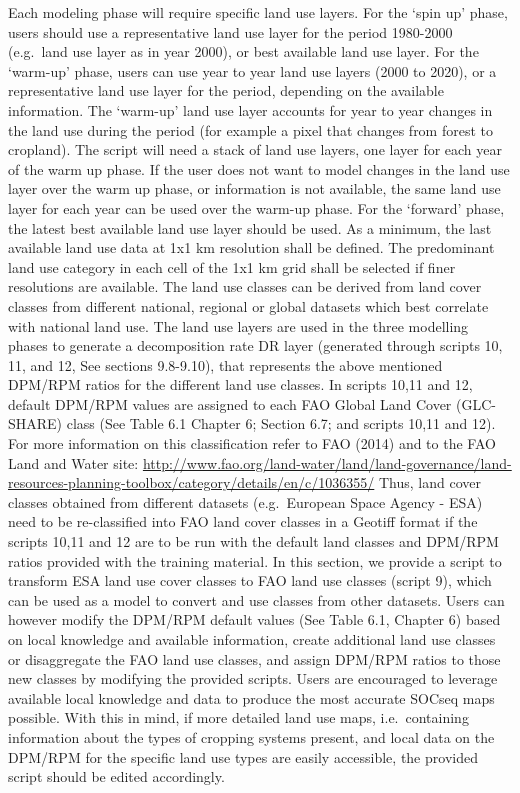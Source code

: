 \documentclass[
  10pt,
  b5paper,
]{book}
\begin{document}
Each modeling phase will require specific land use layers. For the `spin up' phase, users should use a representative land use layer for the period 1980-2000 (e.g.~land use layer as in year 2000), or best available land use layer. For the `warm-up' phase, users can use year to year land use layers (2000 to 2020), or a representative land use layer for the period, depending on the available information. The `warm-up' land use layer accounts for year to year changes in the land use during the period (for example a pixel that changes from forest to cropland). The script will need a stack of land use layers, one layer for each year of the warm up phase. If the user does not want to model changes in the land use layer over the warm up phase, or information is not available, the same land use layer for each year can be used over the warm-up phase. For the `forward' phase, the latest best available land use layer should be used.
As a minimum, the last available land use data at 1x1 km resolution shall be defined. The predominant land use category in each cell of the 1x1 km grid shall be selected if finer resolutions are available.
The land use classes can be derived from land cover classes from different national, regional or global datasets which best correlate with national land use. The land use layers are used in the three modelling phases to generate a decomposition rate DR layer (generated through scripts 10, 11, and 12, See sections 9.8-9.10), that represents the above mentioned DPM/RPM ratios for the different land use classes. In scripts 10,11 and 12, default DPM/RPM values are assigned to each FAO Global Land Cover (GLC-SHARE) class (See Table 6.1 Chapter 6; Section 6.7; and scripts 10,11 and 12). For more information on this classification refer to FAO (2014) and to the FAO Land and Water site: \url{http://www.fao.org/land-water/land/land-governance/land-resources-planning-toolbox/category/details/en/c/1036355/}
Thus, land cover classes obtained from different datasets (e.g.~European Space Agency - ESA) need to be re-classified into FAO land cover classes in a Geotiff format if the scripts 10,11 and 12 are to be run with the default land classes and DPM/RPM ratios provided with the training material.
In this section, we provide a script to transform ESA land use cover classes to FAO land use classes (script 9), which can be used as a model to convert and use classes from other datasets. Users can however modify the DPM/RPM default values (See Table 6.1, Chapter 6) based on local knowledge and available information, create additional land use classes or disaggregate the FAO land use classes, and assign DPM/RPM ratios to those new classes by modifying the provided scripts. Users are encouraged to leverage available local knowledge and data to produce the most accurate SOCseq maps possible. With this in mind, if more detailed land use maps, i.e.~containing information about the types of cropping systems present, and local data on the DPM/RPM for the specific land use types are easily accessible, the provided script should be edited accordingly.\\
\end{document}
